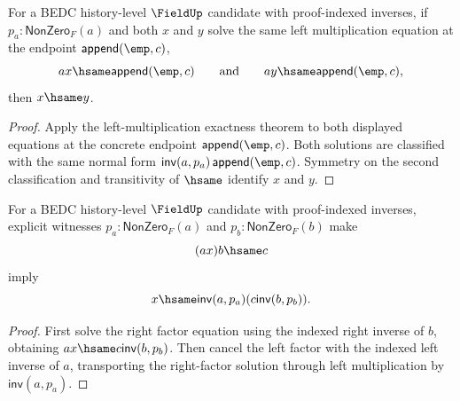 \begin{theorem}
\label{thm:field-left-mul-empty-context-equation-solution-unique-from-apartness}
For a BEDC history-level $\FieldUp$ candidate with proof-indexed inverses, if
$p_a:\mathsf{NonZero}_F(a)$ and both $x$ and $y$ solve the same left
multiplication equation at the endpoint $\mathsf{append}(\emp,c)$,
$$
a x\hsame \mathsf{append}(\emp,c)
\qquad\text{and}\qquad
a y\hsame \mathsf{append}(\emp,c),
$$
then $x\hsame y$.
\end{theorem}
\begin{proof}
Apply the left-multiplication exactness theorem to both displayed equations at
the concrete endpoint $\mathsf{append}(\emp,c)$. Both solutions are classified
with the same normal form
$\mathsf{inv}(a,p_a)\,\mathsf{append}(\emp,c)$. Symmetry on the second
classification and transitivity of $\hsame$ identify $x$ and $y$.
\end{proof}

\begin{theorem}
\label{thm:field-middle-mul-equation-solution-from-apartness}
For a BEDC history-level $\FieldUp$ candidate with proof-indexed inverses,
explicit witnesses $p_a:\mathsf{NonZero}_F(a)$ and
$p_b:\mathsf{NonZero}_F(b)$ make
$$
(a x)b\hsame c
$$
imply
$$
x\hsame \mathsf{inv}(a,p_a)(c\mathsf{inv}(b,p_b)).
$$
\end{theorem}
\begin{proof}
First solve the right factor equation using the indexed right inverse of $b$,
obtaining $a x\hsame c\mathsf{inv}(b,p_b)$. Then cancel the left factor
with the indexed left inverse of $a$, transporting the right-factor solution
through left multiplication by $\mathsf{inv}(a,p_a)$.
\end{proof}

